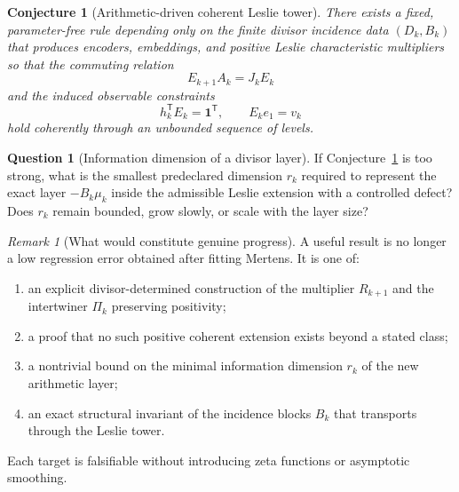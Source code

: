 \documentclass[11pt]{amsart}
\numberwithin{equation}{section}
\theoremstyle{plain}
\newtheorem{conjecture}[theorem]{Conjecture}
\theoremstyle{definition}
\newtheorem{question}[theorem]{Question}
\theoremstyle{remark}
\newtheorem{remark}[theorem]{Remark}
\begin{document}
\begin{conjecture}[Arithmetic-driven coherent Leslie tower]
\label{conj:arithmetic_driven_tower}
There exists a fixed, parameter-free rule depending only on the finite divisor incidence data
$(D_k,B_k)$ that produces encoders, embeddings, and positive Leslie characteristic multipliers
so that the commuting relation
\[
E_{k+1}A_k=J_kE_k
\]
and the induced observable constraints
\[
h_k^{\mathsf T}E_k=\mathbf1^{\mathsf T},
\qquad
E_ke_1=v_k
\]
hold coherently through an unbounded sequence of levels.
\end{conjecture}

\begin{question}[Information dimension of a divisor layer]
\label{q:divisor_layer_information_dimension}
If Conjecture~\ref{conj:arithmetic_driven_tower} is too strong, what is the smallest
predeclared dimension $r_k$ required to represent the exact layer
$-B_k\mu_k$ inside the admissible Leslie extension with a controlled defect?
Does $r_k$ remain bounded, grow slowly, or scale with the layer size?
\end{question}

\begin{remark}[What would constitute genuine progress]
\label{rem:v8_genuine_progress}
A useful result is no longer a low regression error obtained after fitting Mertens.  It is one of:
\begin{enumerate}
\item an explicit divisor-determined construction of the multiplier $R_{k+1}$ and the
intertwiner $\Pi_k$ preserving positivity;
\item a proof that no such positive coherent extension exists beyond a stated class;
\item a nontrivial bound on the minimal information dimension $r_k$ of the new arithmetic layer;
\item an exact structural invariant of the incidence blocks $B_k$ that transports through the
Leslie tower.
\end{enumerate}
Each target is falsifiable without introducing zeta functions or asymptotic smoothing.
\end{remark}
\end{document}

